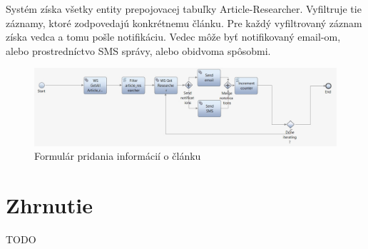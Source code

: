 \documentclass[10pt,oneside,slovak,a4paper]{article}
\begin{document}
Systém získa všetky entity prepojovacej tabuľky Article-Researcher. Vyfiltruje tie záznamy, ktoré zodpovedajú konkrétnemu článku. Pre každý vyfiltrovaný záznam získa vedca a tomu pošle notifikáciu. Vedec môže byť notifikovaný email-om, alebo prostredníctvo SMS správy, alebo obidvoma spôsobmi.

\begin{figure} [H]
\centering
\includegraphics[scale=0.4]{diagrams/diagNotification.jpg} 
\caption{Formulár pridania informácií o článku}
\end{figure}



\newpage

\section{Zhrnutie}
TODO
\end{document}
